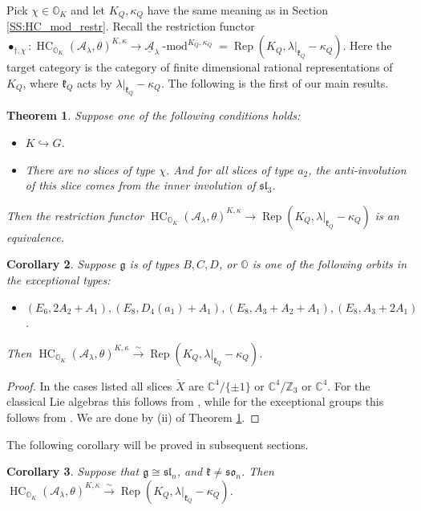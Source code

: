 \documentclass[12pt]{amsart}
\newcommand{\C}{\mathbb{C}}
\newcommand{\A}{\mathcal{A}}
\newcommand{\g}{\mathfrak{g}}
\newcommand{\Orb}{\mathbb{O}}
\newcommand{\kf}{\mathfrak{k}}
\newcommand{\HC}{\operatorname{HC}}
\newtheorem{Thm}{Theorem}[subsection]
\newtheorem{Cor}[Thm]{Corollary}
\theoremstyle{definition}
\numberwithin{equation}{section}
\begin{document}
Pick $\chi\in \Orb_K$ and let $K_Q,\kappa_Q$ have the same meaning as in Section \ref{SS:HC_mod_restr}. Recall the restriction functor $\bullet_{\dagger,\chi}: \HC_{\Orb_K}(\A_\lambda,\theta)^{K,\kappa}
\rightarrow \underline{\A}_\lambda\operatorname{-mod}^{K_Q,\kappa_Q}=\operatorname{Rep}(K_Q,\lambda|_{\kf_Q}-\kappa_Q)$. Here the target category
is the category of finite dimensional rational representations of $K_Q$, where $\kf_Q$ acts by
$\lambda|_{\kf_Q}-\kappa_Q$.
The following is the first of our main results.

\begin{Thm}\label{Thm:main1}
Suppose one of the following conditions holds:
\begin{itemize}
\item[(i)] $K\hookrightarrow G$.
\item[(ii)] There are no slices of type $\chi$. And for all slices of type $a_2$, the anti-involution of this slice comes from the inner involution of $\mathfrak{sl}_3$.
\end{itemize}
Then the restriction functor $\HC_{\Orb_K}(\A_\lambda,\theta)^{K,\kappa}\rightarrow
\operatorname{Rep}(K_Q,\lambda|_{\kf_Q}-\kappa_Q)$ is an equivalence.
\end{Thm}



\begin{Cor}\label{Cor:c_2_tau_slices}
Suppose $\g$ is of types $B,C,D$, or $\Orb$ is one of the following orbits in the exceptional types:
\begin{itemize}
\item $(E_6,2A_2+A_1), (E_8, D_4(a_1)+A_1), (E_8, A_3+A_2+A_1), (E_8,A_3+2A_1)$.
\end{itemize}
Then $\HC_{\Orb_K}(\A_\lambda,\theta)^{K,\kappa}\xrightarrow{\sim}
\operatorname{Rep}(K_Q,\lambda|_{\kf_Q}-\kappa_Q)$.
\end{Cor}
\begin{proof}
In the cases listed all slices $\check{X}$ are $\C^4/\{\pm 1\}$ or $\C^4/\mathbb{Z}_3$ or $\C^4$.
For the classical Lie algebras this follows from \cite{KP2}, while for the exceptional
groups this follows from \cite{FJLS1}. We are done by (ii) of Theorem \ref{Thm:main1}.
\end{proof}

The following corollary will be proved in subsequent sections.

\begin{Cor}\label{Cor:type_A_inner}
Suppose that $\g\cong \mathfrak{sl}_n$, and $\kf\neq \mathfrak{so}_n$. Then
$\HC_{\Orb_K}(\A_\lambda,\theta)^{K,\kappa}\xrightarrow{\sim}
\operatorname{Rep}(K_Q,\lambda|_{\kf_Q}-\kappa_Q)$.
\end{Cor}
\end{document}
